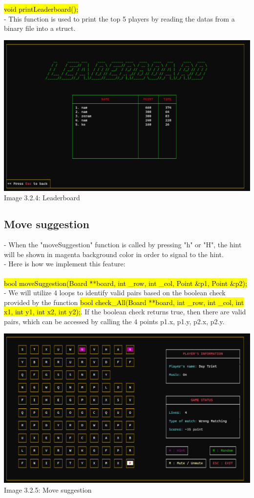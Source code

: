 \documentclass[12pt,a4paper]{report}
\begin{document}
\hl{void printLeaderboard();}\\
\indent - This function is used to print the top 5 players by reading the datas from a binary file into a struct.
 
\begin{center}
    \includegraphics[scale=0.3]{Leaderboard.png}\\[0.2cm]
    Image 3.2.4: Leaderboard
\end{center}
\subsection{Move suggestion}
- When the "moveSuggestion" function is called by pressing "h" or "H", the hint will be shown in magenta background color in order to signal to the hint.\\
- Here is how we implement this feature:\\
 \\
\hl{bool moveSuggestion(Board **board, int \_row, int \_col, Point \&p1, Point \&p2);}\\
\indent - We will utilize 4 loops to identify valid pairs based on the boolean check provided by the function 
\hl{bool check\_All(Board **board, int \_row, int \_col, int x1, int y1, int x2, int y2);}. If the boolean check returns true, then there are valid pairs, which can be accessed by calling the 4 points p1.x, p1.y, p2.x, p2.y.
\begin{center}
    \includegraphics[scale=0.3]{Move Suggestion.png}\\[0.2cm]
    Image 3.2.5: Move suggestion
\end{center}
\end{document}
